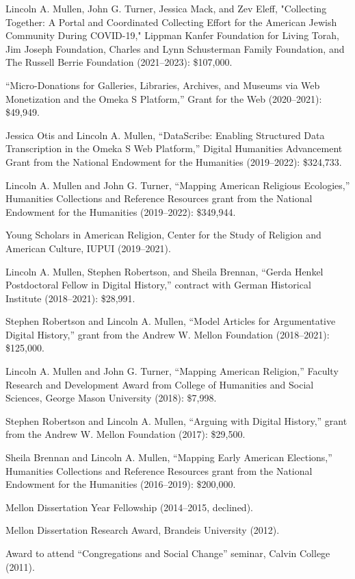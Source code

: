 \documentclass[11pt]{article}
\begin{document}
Lincoln A. Mullen, John G. Turner, Jessica Mack, and Zev Eleff, "Collecting Together: A Portal and Coordinated Collecting Effort for the American Jewish Community During COVID-19," Lippman Kanfer Foundation for Living Torah, Jim Joseph Foundation, Charles and Lynn Schusterman Family Foundation, and The Russell Berrie Foundation (2021--2023): \$107,000.

``Micro-Donations for Galleries, Libraries, Archives, and Museums via Web Monetization and the Omeka S Platform,'' Grant for the Web (2020--2021): \$49,949.

Jessica Otis and Lincoln A. Mullen, ``DataScribe: Enabling Structured Data Transcription in the Omeka S Web Platform,'' Digital Humanities Advancement Grant from the National Endowment for the Humanities (2019--2022): \$324,733.

Lincoln A. Mullen and John G. Turner, ``Mapping American Religious Ecologies,'' Humanities Collections and Reference Resources grant from the National Endowment for the Humanities (2019--2022): \$349,944.

Young Scholars in American Religion, Center for the Study of Religion and American Culture, IUPUI (2019--2021).

Lincoln A. Mullen, Stephen Robertson, and Sheila Brennan, ``Gerda Henkel Postdoctoral Fellow in Digital History,'' contract with German Historical Institute (2018--2021): \$28,991.

Stephen Robertson and Lincoln A. Mullen, ``Model Articles for Argumentative Digital History,'' grant from the Andrew W. Mellon Foundation (2018--2021): \$125,000.

Lincoln A. Mullen and John G. Turner, ``Mapping American Religion,'' Faculty Research and Development Award from College of Humanities and Social Sciences, George Mason University (2018): \$7,998.

Stephen Robertson and Lincoln A. Mullen, ``Arguing with Digital History,'' grant from the Andrew W. Mellon Foundation (2017): \$29,500.

Sheila Brennan and Lincoln A. Mullen, ``Mapping Early American Elections,'' Humanities Collections and Reference Resources grant from the National Endowment for the Humanities (2016--2019): \$200,000. 

Mellon Dissertation Year Fellowship (2014--2015, declined).

Mellon Dissertation Research Award, Brandeis University (2012).

Award to attend ``Congregations and Social Change'' seminar, Calvin College (2011).
\end{document}
